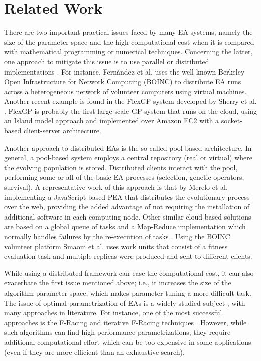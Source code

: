 \section{Related Work}
\label{sec:work}
There are two important practical issues faced by many EA systems, namely the size of the parameter 
space and the high computational cost when it is compared with mathematical programming or numerical techniques.
Concerning the latter, one approach to mitigate this issue is to use parallel or 
distributed implementations \cite{cantu-paz:migration-policies,duda2013gpu}.
For instance, Fern\'andez et al. \cite{nc} %
uses the well-known Berkeley Open Infrastructure for Network Computing (BOINC) to distribute EA runs across a
heterogeneous network of volunteer computers using virtual machines. Another recent example is 
found in the FlexGP system developed by Sherry et al. \cite{sherry2012flex}. FlexGP is probably the first large scale GP system 
that runs on the cloud, using an Island model approach and implemented over Amazon EC2 with a 
socket-based client-server architecture.

Another approach to distributed EAs is the so called pool-based architecture. In general, a 
pool-based system employs a central repository (real or virtual) where the evolving population is stored.
Distributed clients interact with the pool, performing some or all of the basic EA processes 
(selection, genetic operators, survival). A representative work of this approach 
is that by Merelo et al. \cite{agajaj} implementing a JavaScript based PEA that distributes 
the evolutionary process over the web, providing the added advantage of not requiring the 
installation of additional software in each computing node.  Other similar cloud-based solutions 
are based on a global queue of tasks and a Map-Reduce implementation which normally handles failures 
by the re-execution of  tasks \cite{fazenda2012,di2013towards,FlexGP}. Using the BOINC 
volunteer platform  Smaoui et al. \cite{FekiNG09} uses work units that consist of a fitness 
evaluation task and multiple replicas  were produced and sent to different clients.

While using a distributed framework can ease the computational cost, it can also exacerbate the first issue mentioned above;
i.e., it increases the size of the algorithm parameter space, which makes parameter tuning a more difficult task.
The issue of optimal parametrization of EAs is a widely studied subject \cite{de2007parameter}, 
with many approaches in literature. For instance, one of the most successful approaches 
is the F-Racing and iterative F-Racing techniques \cite{lopez2011irace}. 
However, while such algorithms can find high performance parametrizations, 
they require additional computational effort which can be too expensive in some applications
(even if they are more efficient than an exhaustive search).



